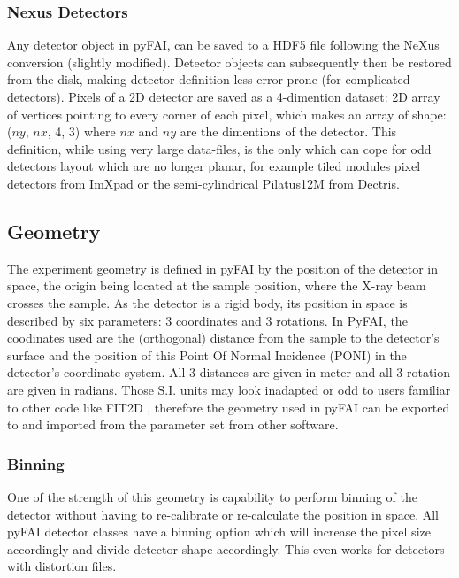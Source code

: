 \documentclass[preprint]{iucr}
\begin{document}
\subsubsection{Nexus Detectors}
Any detector object in pyFAI, can be saved to a HDF5 file following the NeXus
\cite{nexus} conversion (slightly modified).
Detector objects can subsequently then be restored from the disk, making
detector definition less error-prone (for complicated detectors).
Pixels of a 2D detector are saved as a 4-dimention dataset: 2D
array of vertices pointing to every corner of each pixel, which makes an array
of shape: ($ny$, $nx$, 4, 3) where $nx$ and $ny$ are the dimentions of the
detector.
This definition, while using very large data-files, is the only which can
cope for odd detectors layout which are no longer planar, for
example tiled modules pixel detectors from ImXpad or the
semi-cylindrical Pilatus12M from Dectris.

\subsection{Geometry}
The experiment geometry is defined in pyFAI by the position of the detector in
space, the origin being located at the sample position, where the X-ray beam
crosses the sample.
As the detector is a rigid body, its position in space is described by six
parameters: 3 coordinates and 3 rotations. 
In PyFAI, the coodinates used are the (orthogonal) distance from the sample to
the detector's surface and the position of this Point Of Normal Incidence
(PONI) in the detector's coordinate system. 
All 3 distances are given in meter and all 3 rotation are given
in radians.
Those S.I. units may look inadapted or odd to users familiar to other code
like FIT2D \cite{fit2d}, therefore the geometry used in pyFAI can be
exported to and imported from the parameter set from other software.
 
\subsubsection{Binning}
One of the strength of this geometry is capability to perform binning of the
detector without having to re-calibrate or re-calculate the position in space.
All pyFAI detector classes have a binning option which will increase the pixel
size accordingly and divide detector shape accordingly. 
This even works for detectors with distortion files. 
\end{document}
